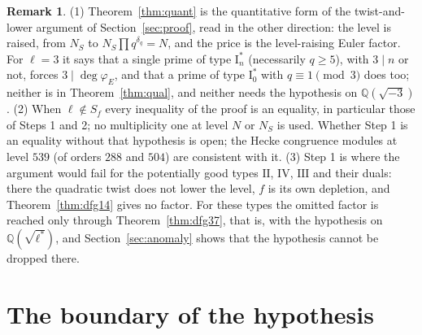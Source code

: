 \documentclass[11pt]{amsart}
\theoremstyle{definition}
\newtheorem{remark}[theorem]{Remark}
\newcommand{\Q}{\mathbb{Q}}
\newcommand{\degphi}{\deg\varphi_E}
\begin{document}
\begin{remark}\label{rem:afterquant}
(1) Theorem~\ref{thm:quant} is the quantitative form of the twist-and-lower argument of Section~\ref{sec:proof}, read in the other direction: the level is raised, from $N_S$ to $N_S\prod q^{\delta_q}=N$, and the price is the level-raising Euler factor. For $\ell=3$ it says that a single prime of type $\mathrm{I}_n^*$ (necessarily $q\ge5$), with $3\mid n$ or not, forces $3\mid\degphi$, and that a prime of type $\mathrm{I}_0^*$ with $q\equiv1\pmod3$ does too; neither is in Theorem~\ref{thm:qual}, and neither needs the hypothesis on $\Q(\sqrt{-3})$. (2) When $\ell\notin S_f$ every inequality of the proof is an equality, in particular those of Steps 1 and 2; no multiplicity one at level $N$ or $N_S$ is used. Whether Step 1 is an equality without that hypothesis is open; the Hecke congruence modules at level $539$ (of orders $288$ and $504$) are consistent with it. (3) Step 1 is where the argument would fail for the potentially good types $\mathrm{II}$, $\mathrm{IV}$, $\mathrm{III}$ and their duals: there the quadratic twist does not lower the level, $f$ is its own depletion, and Theorem~\ref{thm:dfg14} gives no factor. For these types the omitted factor is reached only through Theorem~\ref{thm:dfg37}, that is, with the hypothesis on $\Q(\sqrt{\ell^*})$, and Section~\ref{sec:anomaly} shows that the hypothesis cannot be dropped there.
\end{remark}

\section{The boundary of the hypothesis}\label{sec:boundary}
\end{document}
